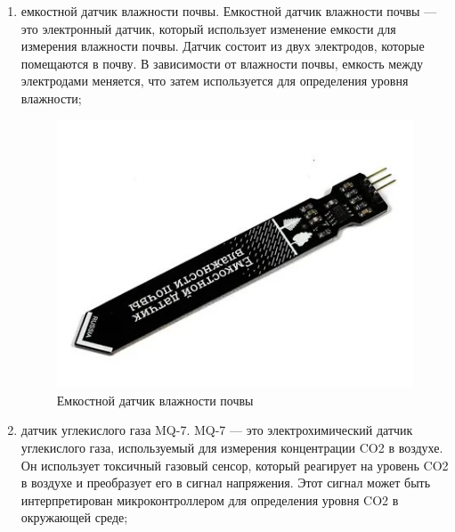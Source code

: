 \begin{enumerate}
    \item емкостной датчик влажности почвы. Емкостной датчик влажности почвы --- это электронный датчик, который использует изменение емкости для измерения влажности почвы. Датчик состоит из двух электродов, которые помещаются в почву. В зависимости от влажности почвы, емкость между электродами меняется, что затем используется для определения уровня влажности;

    \begin{figure}[H]
        \centering
        \includegraphics[scale=0.6]{images/wet.jpg}
        \caption{Емкостной датчик влажности почвы}
        \label{fig:wet}
    \end{figure}
    

    \item датчик углекислого газа MQ-7. MQ-7 --- это электрохимический датчик углекислого газа, используемый для измерения концентрации CO2 в воздухе. Он использует токсичный газовый сенсор, который реагирует на уровень CO2 в воздухе и преобразует его в сигнал напряжения. Этот сигнал может быть интерпретирован микроконтроллером для определения уровня CO2 в окружающей среде;


\end{enumerate}
